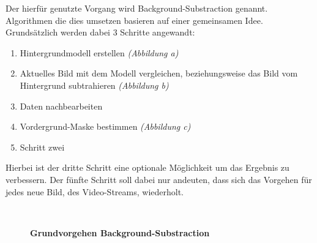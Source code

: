 Der hierfür genutzte Vorgang wird Background-Substraction genannt. Algorithmen die dies umsetzen basieren auf einer gemeinsamen Idee. Grundsätzlich werden dabei 3 Schritte angewandt:
\begin{enumerate}
\item Hintergrundmodell erstellen \textit{(Abbildung  a)}
\item Aktuelles Bild mit dem Modell vergleichen, beziehungsweise das Bild vom Hintergrund subtrahieren \textit{(Abbildung  b)}
\item Daten nachbearbeiten
\item Vordergrund-Maske bestimmen \textit{(Abbildung  c)}
\item Schritt zwei
\end{enumerate}
Hierbei ist der dritte Schritt eine optionale Möglichkeit um das Ergebnis zu verbessern. 
Der fünfte Schritt soll dabei nur andeuten, dass sich das Vorgehen für jedes neue Bild, des Video-Streams, wiederholt.
\begin{figure}[ht]
\qquad
{}\\
\begin{center}
\par\end{center}
\caption{\textbf{Grundvorgehen Background-Substraction}}
\label{Fig:background}
\end{figure}

